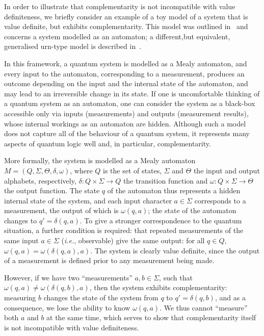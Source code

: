 \documentclass[information,article,accept,moreauthors,pdftex,12pt,a4paper]{mdpi}
\theoremstyle{mdpi}
\newcounter{ex}
\newcounter{re}
\theoremstyle{mdpidefinition}
\begin{document}
In order to illustrate that complementarity is not incompatible with value definiteness, we briefly consider an example of a toy model of a system that is value definite, but exhibits complementarity.\linebreak
This model was outlined in~\cite{svozil-2001-eua} and concerns a system modelled as an automaton; a different,\linebreak but equivalent, generalised urn-type model is described in~\cite{wright}.

In this framework, a quantum system is modelled as a Mealy automaton, and every input to the automaton, corresponding to a measurement, produces an outcome depending on the input and the internal state of the automaton, and may lead to an irreversible change in its state.
If one is uncomfortable thinking of a quantum system as an automaton, one can consider the system as a black-box accessible only via inputs (measurements) and outputs (measurement results), whose internal workings as an automaton are hidden.
Although such a model does not capture all of the behaviour of a quantum system, it represents many aspects of quantum logic well and, in particular, complementarity.

More formally, the system is modelled as a {Mealy automaton} $M=(Q,\Sigma,\Theta,\delta,\omega)$, where $Q$ is the set of states, $\Sigma$ and $\Theta$ the input and output alphabets, respectively, $\delta : Q\times \Sigma \to Q$ the transition function and $\omega: Q \times \Sigma \to \Theta$ the output function.
The state $q$ of the automaton thus represents a hidden internal state of the system, and each input character $a\in \Sigma$ corresponds to a measurement, the output of which is $\omega(q,a)$; the state of the automaton changes to $q'=\delta(q,a)$.
To give a stronger correspondence to the quantum situation, a further condition is required: that repeated measurements of the same input $a\in \Sigma$ (\emph{i.e.}, observable) give the same output:
for all $q\in Q$, $\omega(q,a)=\omega(\delta(q,a),a)$.
The system is clearly value definite, since the output of a measurement is defined prior to any measurement being made.

However, if we have two ``measurements'' $a,b\in \Sigma$, such that $\omega(q,a)\neq \omega(\delta(q,b),a)$, then the system exhibits complementarity:
measuring $b$ changes the state of the system from $q$ to $q'=\delta(q,b)$, and as a consequence, we lose the ability to know $\omega(q,a)$.
We thus cannot ``measure'' both $a$ and $b$ at the same time, which serves to show that complementarity itself is not incompatible with value definiteness.
\end{document}

